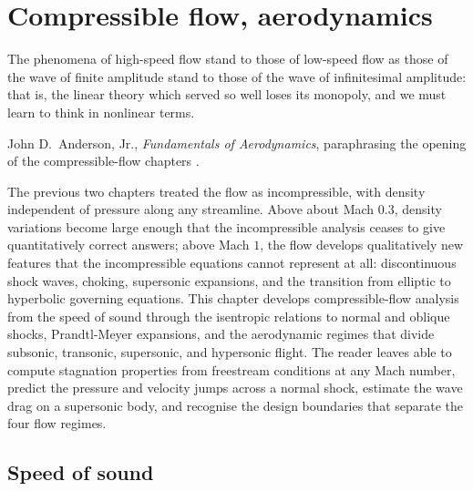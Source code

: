 \chapter{Compressible flow, aerodynamics}
\label{vol03:ch13}

\epigraph{The phenomena of high-speed flow stand to those of
low-speed flow as those of the wave of finite amplitude stand to
those of the wave of infinitesimal amplitude: that is, the linear
theory which served so well loses its monopoly, and we must learn
to think in nonlinear terms.}{John D.\ Anderson, Jr.,
\emph{Fundamentals of Aerodynamics}, paraphrasing the opening of
the compressible-flow chapters \cite[ch.~7,
introductory remarks]{text:anderson-aerodynamics}.}


\noindent
The previous two chapters treated the flow as incompressible, with
density independent of pressure along any streamline. Above about
Mach $0.3$, density variations become large enough that the
incompressible analysis ceases to give quantitatively correct
answers; above Mach $1$, the flow develops qualitatively new
features that the incompressible equations cannot represent at
all: discontinuous shock waves, choking, supersonic expansions,
and the transition from elliptic to hyperbolic governing equations.
This chapter develops compressible-flow analysis from the speed of
sound through the isentropic relations to normal and oblique
shocks, Prandtl-Meyer expansions, and the aerodynamic regimes that
divide subsonic, transonic, supersonic, and hypersonic flight. The
reader leaves able to compute stagnation properties from
freestream conditions at any Mach number, predict the pressure and
velocity jumps across a normal shock, estimate the wave drag on a
supersonic body, and recognise the design boundaries that separate
the four flow regimes.

\section{Speed of sound}

